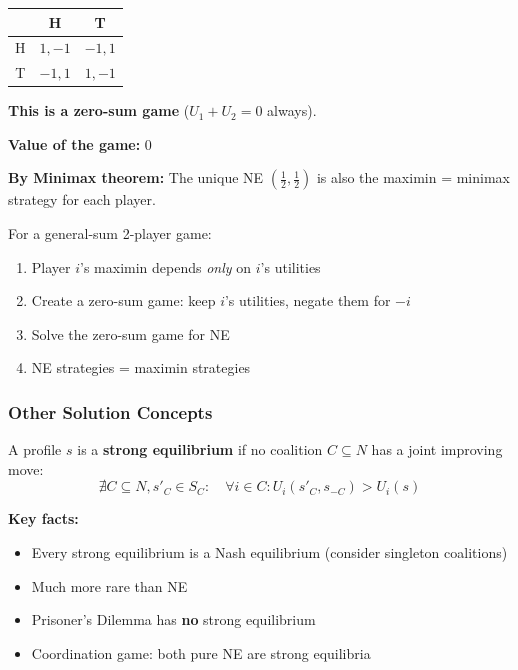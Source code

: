 \begin{exbox}
\begin{center}
\renewcommand{\arraystretch}{1.2}
\begin{tabular}{@{} c | c c @{}}
 & H & T \\
\midrule
H & $1, -1$ & $-1, 1$ \\
T & $-1, 1$ & $1, -1$ \\
\end{tabular}
\end{center}

\textbf{This is a zero-sum game} ($U_1 + U_2 = 0$ always).

\textbf{Value of the game:} 0

\textbf{By Minimax theorem:} The unique NE $\left(\frac{1}{2}, \frac{1}{2}\right)$ is also the maximin = minimax strategy for each player.
\end{exbox}

\begin{tipbox}
For a general-sum 2-player game:
\begin{enumerate}
  \item Player $i$'s maximin depends \textit{only} on $i$'s utilities
  \item Create a zero-sum game: keep $i$'s utilities, negate them for $-i$
  \item Solve the zero-sum game for NE
  \item NE strategies = maximin strategies
\end{enumerate}
\end{tipbox}

\bigseparator

\subsubsection{Other Solution Concepts}

\begin{defbox}
A profile $s$ is a \textbf{strong equilibrium} if no coalition $C \subseteq N$ has a joint improving move:
\[
\nexists C \subseteq N, s'_C \in S_C: \quad \forall i \in C: U_i(s'_C, s_{-C}) > U_i(s)
\]

\textbf{Key facts:}
\begin{itemize}
  \item Every strong equilibrium is a Nash equilibrium (consider singleton coalitions)
  \item Much more rare than NE
  \item Prisoner's Dilemma has \textbf{no} strong equilibrium
  \item Coordination game: both pure NE are strong equilibria
\end{itemize}
\end{defbox}

